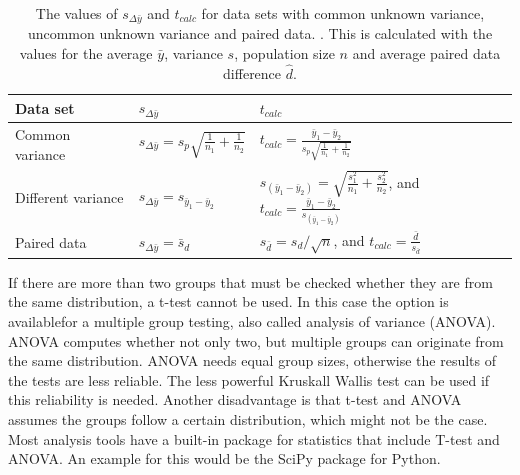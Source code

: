 \documentclass[10pt,a4paper]{article}
\begin{document}
\begin{itemize}
	\begin{table}[h!]
		\centering
		\caption{The values of $s_{\Delta\bar{y}}$ and $t_{calc}$ for data sets 
			with common unknown variance, uncommon unknown variance and paired 
			data. \cite{heiberger2004statistical}. This is calculated with the values for the average $\bar{y}$, variance $s$, population size $n$ and average paired data difference $\hat{d}$.}
		\label{tab:sdyandtcalc}
		\begin{tabular}{lll}
			\hline
			\textbf{Data set}  & \textbf{$s_{\Delta\bar{y}}$}     & 
			\textbf{$t_{calc}$}                                                
			\\ \hline
			Common variance    & $s_{\Delta\bar{y}} = s_p \sqrt{\frac{1}{n_1} + 
				\frac{1}{n_2}}$ & 
			$t_{calc} = \frac{\bar{y}_1-\bar{y}_2}{s_p \sqrt{\frac{1}{n_1} + 
					\frac{1}{n_2}}}         $                                      \\
			Different variance & $s_{\Delta\bar{y}} = s_{\bar{y}_1 - 
				\bar{y}_2}$    & 
			$s_{(\bar{y}_1-\bar{y}_2)} =\sqrt{\frac{s^2_1}{n_1} + 
				\frac{s^2_2}{n_2}}$, and $t_{calc} = \frac{\bar{y}_1 - 
				\bar{y}_2}{s_{(\bar{y}_1-\bar{y}_2)}}$ \\
			Paired data        & $s_{\Delta\bar{y}} = \bar{s}_d$           & 
			$s_{\bar{d}} = s_d / \sqrt{n}$, and $t_{calc} 	
			=\frac{\bar{d}}{s_{\bar{d}}}$                                       
			
			
			\\
			\hline
		\end{tabular}
	\end{table}
	
	If there are more than two groups that must be checked whether they are from the same distribution, a t-test cannot be used. In this case the option is availablefor a multiple group testing, also called analysis of variance (ANOVA). ANOVA computes whether not only two, but multiple groups can originate from the same distribution. ANOVA needs equal group sizes, otherwise the results of the tests are less reliable. The less powerful Kruskall Wallis test can be used if this reliability is needed. Another disadvantage is that t-test and ANOVA assumes the groups follow a certain distribution, which might not be the case\cite{heiberger2004statistical}.
	Most analysis tools have a built-in package for statistics that include T-test and ANOVA. An example for this would be the SciPy\cite{jones2014scipy} package for Python.
	

\end{itemize}
\end{document}
